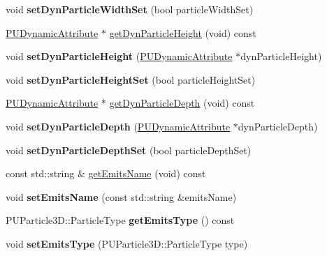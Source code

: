 \begin{DoxyCompactItemize}
\mbox{\label{classPUEmitter_a2977f08f86a9fde77d2440890e4057cc}} 
void {\bfseries set\+Dyn\+Particle\+Width\+Set} (bool particle\+Width\+Set)
\item 
\hyperlink{classPUDynamicAttribute}{P\+U\+Dynamic\+Attribute} $\ast$ \hyperlink{classPUEmitter_a152502932d7c1642eb94f705092c2d60}{get\+Dyn\+Particle\+Height} (void) const
\item 
\mbox{\label{classPUEmitter_ae68d29fc4a0298984ef9c4596e0b2e4a}} 
void {\bfseries set\+Dyn\+Particle\+Height} (\hyperlink{classPUDynamicAttribute}{P\+U\+Dynamic\+Attribute} $\ast$dyn\+Particle\+Height)
\item 
\mbox{\label{classPUEmitter_ae593ed969c3cf8440ea79822678c0c70}} 
void {\bfseries set\+Dyn\+Particle\+Height\+Set} (bool particle\+Height\+Set)
\item 
\hyperlink{classPUDynamicAttribute}{P\+U\+Dynamic\+Attribute} $\ast$ \hyperlink{classPUEmitter_ade71b4c8f846c1599c85bc67ff13ca39}{get\+Dyn\+Particle\+Depth} (void) const
\item 
\mbox{\label{classPUEmitter_a199e6b0337e78d4fd4df4da84461278c}} 
void {\bfseries set\+Dyn\+Particle\+Depth} (\hyperlink{classPUDynamicAttribute}{P\+U\+Dynamic\+Attribute} $\ast$dyn\+Particle\+Depth)
\item 
\mbox{\label{classPUEmitter_ad0c6b343d3055d1e6d6acac2f79754e3}} 
void {\bfseries set\+Dyn\+Particle\+Depth\+Set} (bool particle\+Depth\+Set)
\item 
const std\+::string \& \hyperlink{classPUEmitter_a619f57590dc9af6d3c2f6e72ff0f2e24}{get\+Emits\+Name} (void) const
\item 
\mbox{\label{classPUEmitter_a334fbdd4e50e5a646cce7bc2c4614776}} 
void {\bfseries set\+Emits\+Name} (const std\+::string \&emits\+Name)
\item 
\mbox{\label{classPUEmitter_af3e3054ec17f77bb902bf389d15b40c2}} 
P\+U\+Particle3\+D\+::\+Particle\+Type {\bfseries get\+Emits\+Type} () const
\item 
\mbox{\label{classPUEmitter_ab5ecb43cd684cfbce8b2c635a425c79e}} 
void {\bfseries set\+Emits\+Type} (P\+U\+Particle3\+D\+::\+Particle\+Type type)

\end{DoxyCompactItemize}
